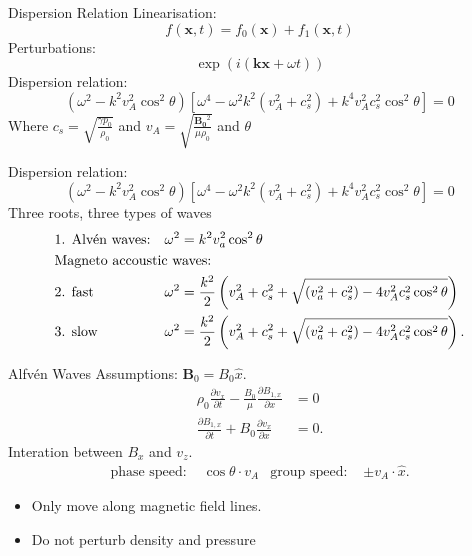 \documentclass{beamer}
\begin{document}
\begin{frame}{Dispersion Relation}
    Linearisation:
        \begin{equation*}
            f(\mathbf{x},t) = f_0(\mathbf{x}) + f_1(\mathbf{x},t)
        \end{equation*}
    Perturbations:
        \begin{equation*}
            \exp(i(\mathbf{kx} + \omega t))
        \end{equation*}
    Dispersion relation:
        \begin{equation*}
	        (\omega^2 - k^2 v_A^2 \cos^2 \theta)\left[ \omega^{4} - \omega^2k^2(v_A^2 + c_s^2) + k^{4}v_A^2c_s^2\cos^2\theta \right]  = 0
        \end{equation*}
        Where $c_s = \sqrt{\frac{\gamma p_0}{\rho_0}}$ and $v_A = \sqrt{\frac{\mathbf{B_0}^2}{\mu\rho_0}}$ and $\theta$
\end{frame}
\begin{frame}
    Dispersion relation:
        \begin{equation*}
	        (\omega^2 - k^2 v_A^2 \cos^2 \theta)\left[ \omega^{4} - \omega^2k^2(v_A^2 + c_s^2) + k^{4}v_A^2c_s^2\cos^2\theta \right]  = 0
        \end{equation*}
Three roots, three types of waves
\begin{align*}
&\text{1. Alv\'en waves:}	& \omega^2 &= k^2 v_a^2 \cos^2 \theta\\
&\text{Magneto accoustic waves:}\hspace{-4cm}\\
&\text{2. fast} 
& \omega^2 &= \frac{k^2}{2}\left( v_A^2 + c_s^2 + \sqrt{(v_a^2 + c_s^2) - 4 v_A^2 c_s^2 \cos^2\theta}  \right) \\
& \text{3. slow} & 
	\omega^2 &= \frac{k^2}{2}\left( v_A^2 + c_s^2 + \sqrt{(v_a^2 + c_s^2) - 4 v_A^2 c_s^2 \cos^2\theta}  \right) 
.\end{align*}
\end{frame}
\begin{frame}{Alfv\'en Waves}
	Assumptions: $\mathbf B_0 = B_0 \hat{x}$. 
	\begin{align*}
		\rho_0 \frac{\partial v_x}{\partial t}  - \frac{B_0}{\mu}\frac{\partial B_{1, x}}{\partial x}  &= 0 \\
		\frac{\partial B_{1,x}}{\partial t}  + B_0 \frac{\partial v_x}{\partial x} &= 0 
	.\end{align*}
	Interation between $B_x$ and $v_z$. 
	\begin{align*}
		\text{phase speed: } & \cos\theta \cdot v_A & \text{group speed: } & \pm v_A \cdot \hat{x}
	.\end{align*}
	\begin{itemize}
		\item Only move along magnetic field lines.
		\item Do not perturb density and pressure
	\end{itemize}
\end{frame}
\end{document}
